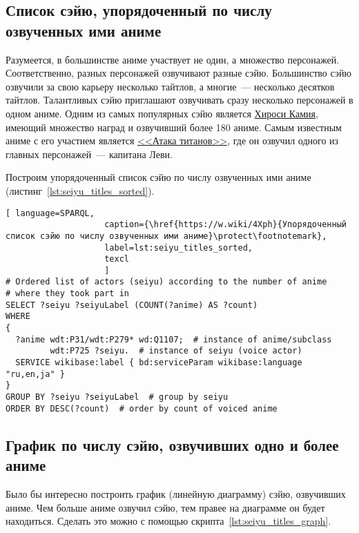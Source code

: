 \subsection{Список сэйю, упорядоченный по числу озвученных ими аниме}

Разумеется, в большинстве аниме участвует не один, а множество персонажей. Соответственно, разных персонажей озвучивают разные сэйю. Большинство сэйю озвучили за свою карьеру несколько тайтлов, а многие~--- несколько десятков тайтлов. Талантливых сэйю приглашают озвучивать сразу несколько персонажей в одном аниме. Одним из самых популярных сэйю является \href{https://w.wiki/4L5q}{Хироси Камия}, имеющий множество наград и озвучивший более 180 аниме. Самым известным аниме с его участием является \href{https://w.wiki/4L5r}{<<Атака титанов>>}, где он озвучил одного из главных персонажей~--- капитана Леви.

Построим упорядоченный список сэйю по числу озвученных ими аниме (листинг~\ref{lst:seiyu_titles_sorted}).

\begin{lstlisting}[ language=SPARQL, 
                    caption={\href{https://w.wiki/4Xph}{Упорядоченный список сэйю по числу озвученных ими аниме}\protect\footnotemark},
                    label=lst:seiyu_titles_sorted,
                    texcl 
                    ]
# Ordered list of actors (seiyu) according to the number of anime
# where they took part in
SELECT ?seiyu ?seiyuLabel (COUNT(?anime) AS ?count)
WHERE
{
  ?anime wdt:P31/wdt:P279* wd:Q1107;  # instance of anime/subclass
         wdt:P725 ?seiyu.  # instance of seiyu (voice actor)
  SERVICE wikibase:label { bd:serviceParam wikibase:language "ru,en,ja" }
}
GROUP BY ?seiyu ?seiyuLabel  # group by seiyu 
ORDER BY DESC(?count)  # order by count of voiced anime
\end{lstlisting}%

\subsection{График по числу сэйю, озвучивших одно и более аниме}

Было бы интересно построить график (линейную диаграмму) сэйю, озвучивших аниме. Чем больше аниме озвучил сэйю, тем правее на диаграмме он будет находиться. Сделать это можно с помощью скрипта~\ref{lst:seiyu_titles_graph}.

